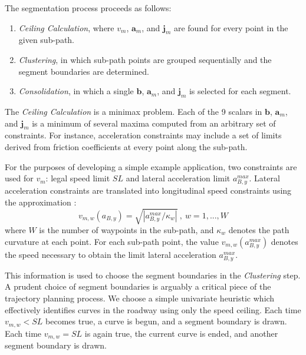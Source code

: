 \documentclass[letterpaper, 10 pt, conference]{ieeeconf}  %
\begin{document}
The segmentation process proceeds as follows:
\begin{enumerate} \label{asdf}
  \item \emph{Ceiling Calculation}, where $v_m$, $\mathbf{a}_m$, and $\mathbf{j}_m$ 
are found for every point in the given sub-path.
  \item \emph{Clustering}, in which sub-path points are grouped sequentially and the segment boundaries are determined.
  \item \emph{Consolidation}, in which a single $\mathbf{b}$, $\mathbf{a}_m$, and $\mathbf{j}_m$ is selected for each segment.
\end{enumerate}

The {\it Ceiling Calculation} is a minimax problem.
Each of the 9 scalars in $\mathbf{b}$, $\mathbf{a}_m$, and $\mathbf{j}_m$ is a minimum of several maxima computed from an arbitrary set of constraints.
For instance, acceleration constraints may include a set of limits derived from friction coefficients at every point along the sub-path.

For the purposes of developing a simple example application, two constraints are used for $v_{m}$: legal speed limit $SL$ and lateral acceleration limit $a_{B,y}^{max}$. 
Lateral acceleration constraints are translated into longitudinal speed constraints using the approximation :
\begin{equation}
  v_{m,w}(a_{B,y}) = \sqrt{ | a_{B,y}^{max} / \kappa_{w} | } ~,~ w = 1, ..., W
\end{equation}
where $W$ is the number of waypoints in the sub-path, and $\kappa_{w}$ denotes the path curvature at each point.
For each sub-path point, the value $v_{m,w}(a_{B,y}^{max})$ denotes the speed necessary to obtain the limit lateral acceleration $a^{max}_{B,y}$.

This information is used to choose the segment boundaries in the {\it Clustering} step.
A prudent choice of segment boundaries is arguably a critical piece of the trajectory planning process.
We choose a simple univariate heuristic which effectively identifies curves in the roadway using only the speed ceiling.
Each time $v_{m,w} < SL$ becomes true, a curve is begun, and a segment boundary is drawn.
Each time $v_{m,w} = SL$ is again true, the current curve is ended, and another segment boundary is drawn.
\end{document}

